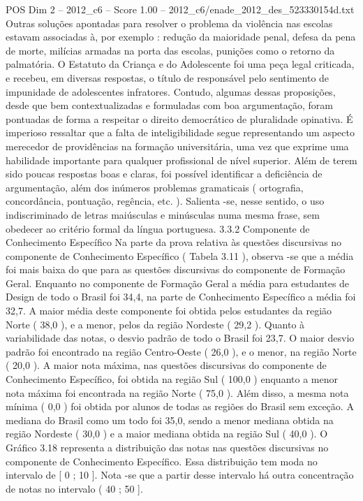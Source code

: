 \begin{textsample}{POS Dim 2 – 2012\_c6 – Score 1.00 – 2012\_c6/enade\_2012\_des\_523330154d.txt}
Outras soluções apontadas para resolver o problema da violência nas escolas estavam associadas à, por exemplo : redução da maioridade penal, defesa da pena de morte, milícias armadas na porta das escolas, punições como o retorno da palmatória.
O Estatuto da Criança e do Adolescente foi uma peça legal criticada, e recebeu, em diversas respostas, o título de responsável pelo sentimento de impunidade de adolescentes infratores.
Contudo, algumas dessas proposições, desde que bem contextualizadas e formuladas com boa argumentação, foram pontuadas de forma a respeitar o direito democrático de pluralidade opinativa.
É imperioso ressaltar que a falta de inteligibilidade segue representando um aspecto merecedor de providências na formação universitária, uma vez que exprime uma habilidade importante para qualquer profissional de nível superior.
Além de terem sido poucas respostas boas e claras, foi possível identificar a deficiência de argumentação, além dos inúmeros problemas gramaticais ( ortografia, concordância, pontuação, regência, etc. ).
Salienta -se, nesse sentido, o uso indiscriminado de letras maiúsculas e minúsculas numa mesma frase, sem obedecer ao critério formal da língua portuguesa. 3.3.2 Componente de Conhecimento Específico Na parte da prova relativa às questões discursivas no componente de Conhecimento Específico ( Tabela 3.11 ), observa -se que a média foi mais baixa do que para as questões discursivas do componente de Formação Geral.
Enquanto no componente de Formação Geral a média para estudantes de Design de todo o Brasil foi 34,4, na parte de Conhecimento Específico a média foi 32,7.
A maior média deste componente foi obtida pelos estudantes da região Norte ( 38,0 ), e a menor, pelos da região Nordeste ( 29,2 ).
Quanto à variabilidade das notas, o desvio padrão de todo o Brasil foi 23,7.
O maior desvio padrão foi encontrado na região Centro-Oeste ( 26,0 ), e o menor, na região Norte ( 20,0 ).
A maior nota máxima, nas questões discursivas do componente de Conhecimento Específico, foi obtida na região Sul ( 100,0 ) enquanto a menor nota máxima foi encontrada na região Norte ( 75,0 ).
Além disso, a mesma nota mínima ( 0,0 ) foi obtida por alunos de todas as regiões do Brasil sem exceção.
A mediana do Brasil como um todo foi 35,0, sendo a menor mediana obtida na região Nordeste ( 30,0 ) e a maior mediana obtida na região Sul ( 40,0 ).
O Gráfico 3.18 representa a distribuição das notas nas questões discursivas no componente de Conhecimento Específico.
Essa distribuição tem moda no intervalo de [ 0 ; 10 ].
Nota -se que a partir desse intervalo há outra concentração de notas no intervalo ( 40 ; 50 ].

\end{textsample}

